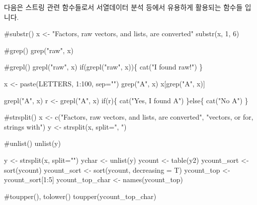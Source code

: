 \documentclass[
  a4paper,
]{book}
\newenvironment{Shaded}{\begin{snugshade}}{\end{snugshade}}
\newcommand{\AttributeTok}[1]{\textcolor[rgb]{0.40,0.45,0.13}{#1}}
\newcommand{\CommentTok}[1]{\textcolor[rgb]{0.37,0.37,0.37}{#1}}
\newcommand{\ControlFlowTok}[1]{\textcolor[rgb]{0.00,0.23,0.31}{#1}}
\newcommand{\DecValTok}[1]{\textcolor[rgb]{0.68,0.00,0.00}{#1}}
\newcommand{\FunctionTok}[1]{\textcolor[rgb]{0.28,0.35,0.67}{#1}}
\newcommand{\NormalTok}[1]{\textcolor[rgb]{0.00,0.23,0.31}{#1}}
\newcommand{\OtherTok}[1]{\textcolor[rgb]{0.00,0.23,0.31}{#1}}
\newcommand{\SpecialCharTok}[1]{\textcolor[rgb]{0.37,0.37,0.37}{#1}}
\newcommand{\StringTok}[1]{\textcolor[rgb]{0.13,0.47,0.30}{#1}}
\begin{document}
다음은 스트링 관련 함수들로서 서열데이터 분석 등에서 유용하게 활용되는
함수들 입니다.

\begin{Shaded}
\begin{Highlighting}[]
\CommentTok{\#substr()}
\NormalTok{x }\OtherTok{\textless{}{-}} \StringTok{"Factors, raw vectors, and lists, are converted"}
\FunctionTok{substr}\NormalTok{(x, }\DecValTok{1}\NormalTok{, }\DecValTok{6}\NormalTok{)}

\CommentTok{\#grep()}
\FunctionTok{grep}\NormalTok{(}\StringTok{"raw"}\NormalTok{, x)}

\CommentTok{\#grepl()}
\FunctionTok{grepl}\NormalTok{(}\StringTok{"raw"}\NormalTok{, x)}
\ControlFlowTok{if}\NormalTok{(}\FunctionTok{grepl}\NormalTok{(}\StringTok{"raw"}\NormalTok{, x))\{}
  \FunctionTok{cat}\NormalTok{(}\StringTok{"I found raw!"}\NormalTok{)}
\NormalTok{\}}

\NormalTok{x }\OtherTok{\textless{}{-}} \FunctionTok{paste}\NormalTok{(LETTERS, }\DecValTok{1}\SpecialCharTok{:}\DecValTok{100}\NormalTok{, }\AttributeTok{sep=}\StringTok{""}\NormalTok{)}
\FunctionTok{grep}\NormalTok{(}\StringTok{"A"}\NormalTok{, x)}
\NormalTok{x[}\FunctionTok{grep}\NormalTok{(}\StringTok{"A"}\NormalTok{, x)]}

\FunctionTok{grepl}\NormalTok{(}\StringTok{"A"}\NormalTok{, x)}
\NormalTok{r }\OtherTok{\textless{}{-}} \FunctionTok{grepl}\NormalTok{(}\StringTok{"A"}\NormalTok{, x)}
\ControlFlowTok{if}\NormalTok{(r)\{}
  \FunctionTok{cat}\NormalTok{(}\StringTok{"Yes, I found A"}\NormalTok{)}
\NormalTok{\}}\ControlFlowTok{else}\NormalTok{\{}
  \FunctionTok{cat}\NormalTok{(}\StringTok{"No A"}\NormalTok{)}
\NormalTok{\}}

\CommentTok{\#strsplit()}
\NormalTok{x }\OtherTok{\textless{}{-}} \FunctionTok{c}\NormalTok{(}\StringTok{"Factors, raw vectors, and lists, are converted"}\NormalTok{, }\StringTok{"vectors, or for, strings with"}\NormalTok{)}
\NormalTok{y }\OtherTok{\textless{}{-}} \FunctionTok{strsplit}\NormalTok{(x, }\AttributeTok{split=}\StringTok{", "}\NormalTok{)}

\CommentTok{\#unlist()}
\FunctionTok{unlist}\NormalTok{(y)}

\NormalTok{y }\OtherTok{\textless{}{-}} \FunctionTok{strsplit}\NormalTok{(x, }\AttributeTok{split=}\StringTok{""}\NormalTok{)}
\NormalTok{ychar }\OtherTok{\textless{}{-}} \FunctionTok{unlist}\NormalTok{(y)}
\NormalTok{ycount }\OtherTok{\textless{}{-}} \FunctionTok{table}\NormalTok{(y2)}
\NormalTok{ycount\_sort }\OtherTok{\textless{}{-}} \FunctionTok{sort}\NormalTok{(ycount)}
\NormalTok{ycount\_sort }\OtherTok{\textless{}{-}} \FunctionTok{sort}\NormalTok{(ycount, }\AttributeTok{decreasing =}\NormalTok{ T)}
\NormalTok{ycount\_top }\OtherTok{\textless{}{-}}\NormalTok{ ycount\_sort[}\DecValTok{1}\SpecialCharTok{:}\DecValTok{5}\NormalTok{]}
\NormalTok{ycount\_top\_char }\OtherTok{\textless{}{-}} \FunctionTok{names}\NormalTok{(ycount\_top)}

\CommentTok{\#toupper(), tolower()}
\FunctionTok{toupper}\NormalTok{(ycount\_top\_char)}
\end{Highlighting}
\end{Shaded}
\end{document}
